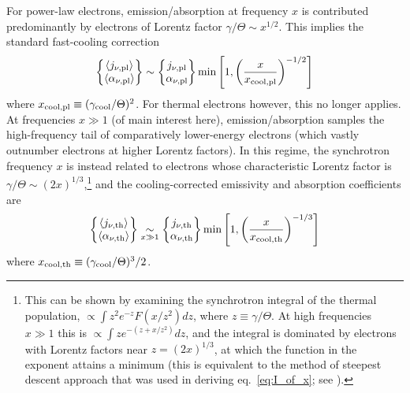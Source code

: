 \documentclass[twocolumn]{aastex63}
\begin{document}
For power-law electrons, emission/absorption at frequency $x$ is contributed predominantly by electrons of Lorentz factor $\gamma/\Theta \sim x^{1/2}$. This implies the standard fast-cooling correction
\begin{equation}
\label{eq:cooling_correction_pl}
    \begin{Bmatrix} \left\langle j_{\nu,{\rm pl}} \right\rangle \\ \left\langle \alpha_{\nu,{\rm pl}} \right\rangle \end{Bmatrix} 
    \sim
    \begin{Bmatrix} j_{\nu,{\rm pl}} \\ \alpha_{\nu,{\rm pl}} \end{Bmatrix} 
    \min \left[ 1, \left(\frac{x}{x_{\rm cool,pl}}\right)^{-1/2} \right]
\end{equation}
where $x_{\rm cool,pl} \equiv (\gamma_{\rm cool}/\Theta)^2$.
For thermal electrons however, this no longer applies. At frequencies $x \gg 1$ (of main interest here), emission/absorption samples the high-frequency tail of comparatively lower-energy electrons (which vastly outnumber electrons at higher Lorentz factors). 
In this regime, the synchrotron frequency $x$ is instead related to electrons whose characteristic Lorentz factor is $\gamma/\Theta \sim (2x)^{1/3}$,\footnote{
This can be shown by examining the synchrotron integral of the thermal population, $\propto \int z^2 e^{-z} F(x/z^2) dz$, where $z \equiv \gamma/\Theta$. At high frequencies $x \gg 1$ this is $\propto \int z e^{-(z+x/z^2)} dz$, and the integral is dominated by electrons with Lorentz factors near $z = (2x)^{1/3}$, at which the function in the exponent attains a minimum (this is equivalent to the method of steepest descent approach that was used in deriving eq.~\ref{eq:I_of_x}; see \citealt{Petrosian81}).
}
and the cooling-corrected emissivity and absorption coefficients are
\begin{equation}
\label{eq:cooling_correction_th}
    \begin{Bmatrix} \left\langle j_{\nu,{\rm th}} \right\rangle \\ \left\langle \alpha_{\nu,{\rm th}} \right\rangle \end{Bmatrix} 
    \underset{x \gg 1}{\sim}
    \begin{Bmatrix} j_{\nu,{\rm th}} \\ \alpha_{\nu,{\rm th}} \end{Bmatrix} 
    \min \left[ 1, \left(\frac{x}{x_{\rm cool,th}}\right)^{-1/3} \right]
\end{equation}
where $x_{\rm cool,th} \equiv (\gamma_{\rm cool}/\Theta)^3/2$.
\end{document}
